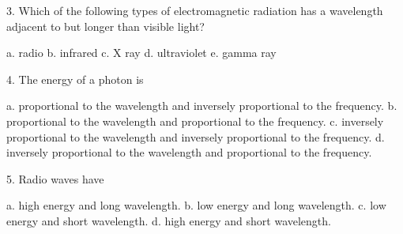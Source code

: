 





3. Which of the following types of electromagnetic radiation has
a wavelength adjacent to but longer than visible light?

a. radio
b. infrared
c. X ray
d. ultraviolet
e. gamma ray

4. The energy of a photon is

a. proportional to the wavelength and inversely proportional to the frequency.
b. proportional to the wavelength and proportional to the frequency.
c. inversely proportional to the wavelength and inversely proportional to the frequency.
d. inversely proportional to the wavelength and proportional to the frequency.

5. Radio waves have

a. high energy and long wavelength.
b. low energy and long wavelength.
c. low energy and short wavelength.
d. high energy and short wavelength.

